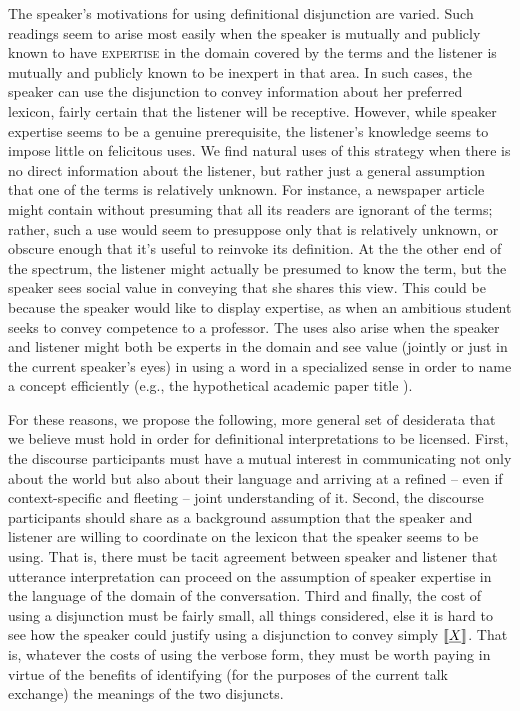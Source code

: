 \documentclass[12pt,twoside]{article}
\renewcommand{\_}{\textbf{\textunderscore\hspace{-4pt}\textunderscore\hspace{-3pt}\textunderscore\hspace{-4pt}\textunderscore}\hspace{0.5pt}}			%
\newcommand{\technicalTerm}[1]{\textsc{#1}}
\begin{document}
The speaker's motivations for using definitional disjunction are
varied. Such readings seem to arise most easily when the speaker is
mutually and publicly known to have \technicalTerm{expertise} in the
domain covered by the terms and the listener is mutually and publicly
known to be inexpert in that area. In such cases, the speaker can use
the disjunction to convey information about her preferred lexicon,
fairly certain that the listener will be receptive. However, while
speaker expertise seems to be a genuine prerequisite, the listener's
knowledge seems to impose little on felicitous uses. We find natural
uses of this strategy when there is no direct information about the
listener, but rather just a general assumption that one of the terms
is relatively unknown. For instance, a newspaper article might contain
 without presuming that all its readers
are ignorant of the terms; rather, such a use would seem to presuppose
only that  is relatively unknown, or obscure enough
that it's useful to reinvoke its definition. At the the other end of
the spectrum, the listener might actually be presumed to know the
term, but the speaker sees social value in conveying that she shares
this view. This could be because the speaker would like to display
expertise, as when an ambitious student seeks to convey competence to
a professor. The uses also arise when the speaker and listener might
both be experts in the domain and see value (jointly or just in the
current speaker's eyes) in using a word in a specialized sense in
order to name a concept efficiently (e.g., the hypothetical academic
paper title ).

For these reasons, we propose the following, more general set of
desiderata that we believe must hold in order for definitional
interpretations to be licensed.  First, the discourse participants
must have a mutual interest in communicating not only about the world
but also about their language and arriving at a refined -- even if
context-specific and fleeting -- joint understanding of it. Second,
the discourse participants should share as a background assumption
that the speaker and listener are willing to coordinate on the lexicon
that the speaker seems to be using.  That is, there must be tacit
agreement between speaker and listener that utterance interpretation
can proceed on the assumption of speaker expertise in the language of
the domain of the conversation.  Third and finally, the cost of using a
disjunction must be fairly small, all things considered, else it is
hard to see how the speaker could justify using a disjunction  to convey simply $\llbracket\emph{X\/}\rrbracket$.  That is, whatever the
costs of using the verbose form, they must be worth paying in virtue
of the benefits of identifying (for the purposes of the current talk
exchange) the meanings of the two disjuncts.
\end{document}
